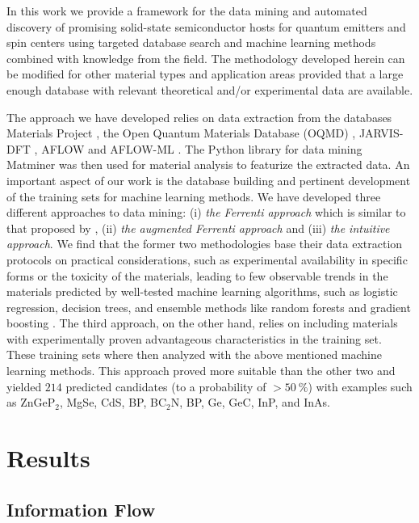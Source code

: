 \documentclass[superscriptaddress,unsortedaddress,
 amsmath,amssymb,
 aps,
]{revtex4-2}
\begin{document}
In this work we provide a framework for the data mining and automated discovery of promising solid-state semiconductor hosts for quantum emitters and spin centers using targeted database search and machine learning methods combined with knowledge from the field. The methodology developed herein can be modified for other material types and application areas provided that a large enough database with relevant theoretical and/or experimental data are available. 

The approach we have developed relies on data extraction from the databases Materials Project \cite{Jain2013,Jain2018}, the Open Quantum Materials Database (OQMD) \cite{Saal2013, Kirklin2015}, JARVIS-DFT \cite{Choudhary2020}, AFLOW \cite{Curtarolo2012, Curtarolo2012a, Calderon2015} and AFLOW-ML \cite{Isayev2017}. 
The Python library for data mining Matminer \cite{Ward2018} was then used for material analysis to featurize the extracted data. An important aspect of our work is the database building and pertinent development of the training sets for machine learning methods. We have developed three different approaches to data mining: (i) \emph{the Ferrenti approach} which is similar to that proposed by \citeauthor{Ferrenti2020}  \cite{Ferrenti2020}, (ii) \emph{the augmented Ferrenti approach} and (iii) \emph{the intuitive approach}. We find that the former two methodologies base their data extraction protocols on practical considerations, such as experimental availability in specific forms or the toxicity of the materials, leading to few observable trends in the materials predicted by well-tested machine learning algorithms, such as logistic regression, decision trees, and ensemble methods like random forests and gradient boosting \cite{Mehta2019,Hastie2009}. The third approach, on the other hand, relies on including materials with experimentally proven advantageous characteristics in the training set. These training sets where then analyzed with the above mentioned machine learning methods. This approach proved more suitable than the other two and yielded $214$ predicted candidates (to a probability of $>50 \ \%$) with examples such as ZnGeP$_2$, MgSe, CdS, BP, BC$_2$N, BP, Ge, GeC, InP, and InAs. 

\section*{Results}

\subsection*{Information Flow} 
\end{document}
